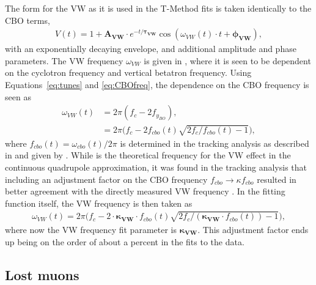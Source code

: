 The form for the VW as it is used in the T-Method fits is taken identically to the CBO terms, 
    \begin{align} \label{eq:VWterm}
        V(t) = 1 + \boldsymbol{A_{VW}} \cdot e^{-t/\boldsymbol{\tau_{VW}}} \cos(\omega_{VW}(t) \cdot t + \boldsymbol{\phi_{VW}}), 
    \end{align}
with an exponentially decaying envelope, and additional amplitude and phase parameters. The VW frequency $\omega_{VW}$ is given in , where it is seen to be dependent on the cyclotron frequency and vertical betatron frequency. Using Equations~\ref{eq:tunes} and \ref{eq:CBOfreq}, the dependence on the CBO frequency is seen as
    \begin{equation}
    \begin{aligned}
        \omega_{VW}(t) &= 2\pi (f_{c} - 2f_{y_{BO}}), \\
                    &= 2\pi \Big(f_{c} - 2f_{cbo}(t)\sqrt{2f_{c}/f_{cbo}(t)-1}\Big),
    \label{eq:VWfreqOne}
    \end{aligned}
    \end{equation}
where $f_{cbo}(t) = \omega_{cbo}(t)/2\pi$ is determined in the tracking analysis as described in  and given by . While  is the theoretical frequency for the VW effect in the continuous quadrupole approximation, it was found in the tracking analysis that including an adjustment factor on the CBO frequency $f_{cbo} \rightarrow \kappa f_{cbo}$ resulted in better agreement with the directly measured VW frequency \cite{cbofrequency,verticalbetatron}. In the fitting function itself, the VW frequency is then taken as
    \begin{align} \label{eq:VWfreqKappa}
        \omega_{VW}(t) = 2\pi \Big(f_{c} - 2 \cdot \boldsymbol{\kappa_{VW}} \cdot f_{cbo}(t)\sqrt{2f_{c}/(\boldsymbol{\kappa_{VW}} \cdot f_{cbo}(t))-1}\Big),
    \end{align}
where now the VW frequency fit parameter is $\boldsymbol{\kappa_{VW}}$. This adjustment factor ends up being on the order of about a percent in the fits to the data.




\subsection{Lost muons}
\label{subsec:lostmuons}


